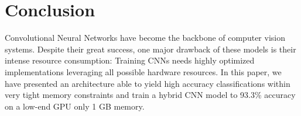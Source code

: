 \documentclass[10pt,twocolumn,letterpaper]{article}
\begin{document}
\section{Conclusion} 
Convolutional Neural Networks have become the backbone of computer vision systems. Despite their great success, one major drawback of these models is their intense resource consumption: Training CNNs needs highly optimized implementations leveraging all possible hardware resources. In this paper, we have presented an architecture able to yield high accuracy classifications within very tight memory constraints and train a hybrid CNN model to 93.3\% accuracy on a low-end GPU only 1 GB memory.


{\small


}
\end{document}

